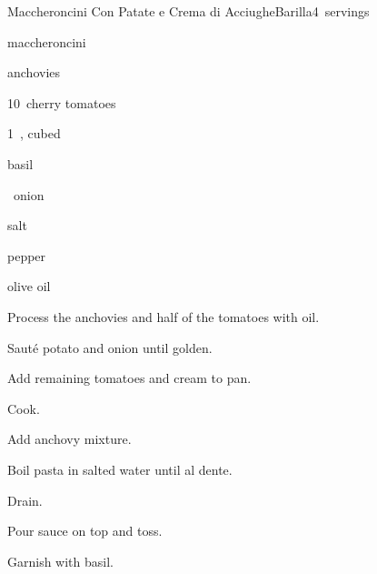 \begin{recipe}{Maccheroncini Con Patate e Crema di Acciughe}{Barilla}{4~servings}

\begin{ingredients}
\item {} maccheroncini
\item {} anchovies
\item 10~cherry tomatoes
\item 1~, cubed
\item basil
\item {} 
\item \half~onion
\item salt
\item pepper
\item olive oil
\end{ingredients}

\begin{directions}
\item Process the anchovies and half of the tomatoes with oil.
\item Sauté potato and onion until golden.
\item Add remaining tomatoes and cream to pan.
\item Cook.
\item Add anchovy mixture.
\item Boil pasta in salted water until al dente.
\item Drain.
\item Pour sauce on top and toss.
\item Garnish with basil.
\end{directions}

\end{recipe}
